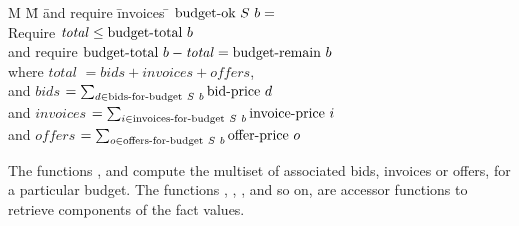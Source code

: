 \begin{tabbing}
M \= M \= and require \= invoices \= \kill
\> $\textrm{budget-ok}~{S}~b = $ \\
\> \> Require \> $\mathit{total} \le \textrm{budget-total}~b$ \\
\> \> and require \> $\textrm{budget-total}~b - \mathit{total} = \textrm{budget-remain}~b$ \\
\> \> where \> $\mathit{total}$ \> $= \mathit{bids} + \mathit{invoices} + \mathit{offers}$, \\
\> \> and \> $\mathit{bids}$ \> $= \sum_{d \in \textrm{bids-for-budget}~S~b} \textrm{bid-price}~d$ \\
\> \> and \> $\mathit{invoices}$ \> $= \sum_{i \in \textrm{invoices-for-budget}~S~b} \textrm{invoice-price}~i$ \\
\> \> and \> $\mathit{offers}$ \> $= \sum_{o \in \textrm{offers-for-budget}~S~b} \textrm{offer-price}~o$ \\
\end{tabbing}

The functions ,  and  compute the multiset of associated bids, invoices or offers, for a particular budget. 
The functions , , , and so on, are accessor functions to retrieve components of the fact values.
